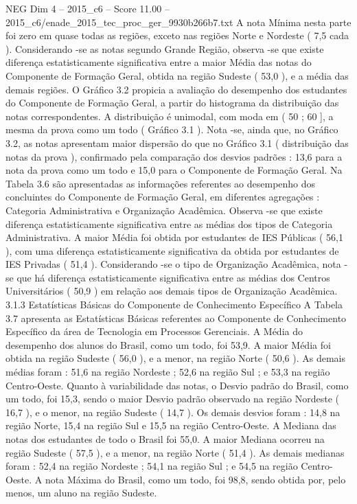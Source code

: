 \begin{textsample}{NEG Dim 4 – 2015\_c6 – Score 11.00 – 2015\_c6/enade\_2015\_tec\_proc\_ger\_9930b266b7.txt}
A nota Mínima nesta parte foi zero em quase todas as regiões, exceto nas regiões Norte e Nordeste ( 7,5 cada ).
Considerando -se as notas segundo Grande Região, observa -se que existe diferença estatisticamente significativa entre a maior Média das notas do Componente de Formação Geral, obtida na região Sudeste ( 53,0 ), e a média das demais regiões.
O Gráfico 3.2 propicia a avaliação do desempenho dos estudantes do Componente de Formação Geral, a partir do histograma da distribuição das notas correspondentes.
A distribuição é unimodal, com moda em ( 50 ; 60 ], a mesma da prova como um todo ( Gráfico 3.1 ).
Nota -se, ainda que, no Gráfico 3.2, as notas apresentam maior dispersão do que no Gráfico 3.1 ( distribuição das notas da prova ), confirmado pela comparação dos desvios padrões : 13,6 para a nota da prova como um todo e 15,0 para o Componente de Formação Geral.
Na Tabela 3.6 são apresentadas as informações referentes ao desempenho dos concluintes do Componente de Formação Geral, em diferentes agregações : Categoria Administrativa e Organização Acadêmica.
Observa -se que existe diferença estatisticamente significativa entre as médias dos tipos de Categoria Administrativa.
A maior Média foi obtida por estudantes de IES Públicas ( 56,1 ), com uma diferença estatisticamente significativa da obtida por estudantes de IES Privadas ( 51,4 ).
Considerando -se o tipo de Organização Acadêmica, nota -se que há diferença estatisticamente significativa entre as médias dos Centros Universitários ( 50,9 ) em relação aos demais tipos de Organização Acadêmica. 3.1.3 Estatísticas Básicas do Componente de Conhecimento Específico A Tabela 3.7 apresenta as Estatísticas Básicas referentes ao Componente de Conhecimento Específico da área de Tecnologia em Processos Gerenciais.
A Média do desempenho dos alunos do Brasil, como um todo, foi 53,9.
A maior Média foi obtida na região Sudeste ( 56,0 ), e a menor, na região Norte ( 50,6 ).
As demais médias foram : 51,6 na região Nordeste ; 52,6 na região Sul ; e 53,3 na região Centro-Oeste.
Quanto à variabilidade das notas, o Desvio padrão do Brasil, como um todo, foi 15,3, sendo o maior Desvio padrão observado na região Nordeste ( 16,7 ), e o menor, na região Sudeste ( 14,7 ).
Os demais desvios foram : 14,8 na região Norte, 15,4 na região Sul e 15,5 na região Centro-Oeste.
A Mediana das notas dos estudantes de todo o Brasil foi 55,0.
A maior Mediana ocorreu na região Sudeste ( 57,5 ), e a menor, na região Norte ( 51,4 ).
As demais medianas foram : 52,4 na região Nordeste ; 54,1 na região Sul ; e 54,5 na região Centro-Oeste.
A nota Máxima do Brasil, como um todo, foi 98,8, sendo obtida por, pelo menos, um aluno na região Sudeste.

\end{textsample}
